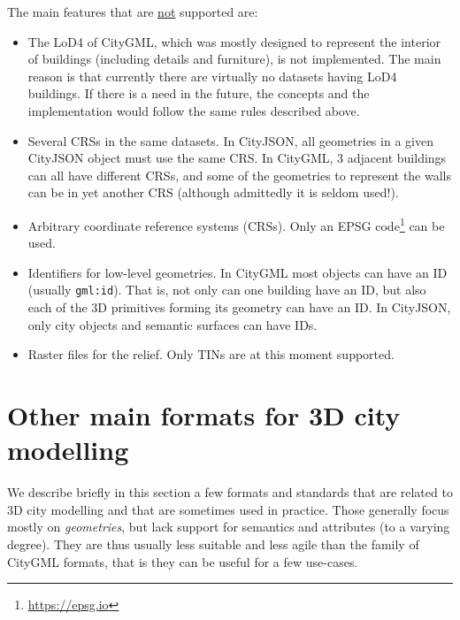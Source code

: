 %

The main features that are \underline{not} supported are:
\begin{itemize}
  \item The LoD4 of CityGML, which was mostly designed to represent the interior of buildings (including details and furniture), is not implemented. The main reason is that currently there are virtually no datasets having LoD4 buildings. If there is a need in the future, the concepts and the implementation would follow the same rules described above.
  \item Several CRSs in the same datasets. In CityJSON, all geometries in a given CityJSON object must use the same CRS\@. In CityGML, 3 adjacent buildings can all have different CRSs, and some of the geometries to represent the walls can be in yet another CRS (although admittedly it is seldom used!).
  \item Arbitrary coordinate reference systems (CRSs). Only an EPSG code\footnote{\url{https://epsg.io}} can be used. 
  \item Identifiers for low-level geometries. In CityGML most objects can have an ID (usually \texttt{gml:id}). That is, not only can one building have an ID, but also each of the 3D primitives forming its geometry can have an ID\@. In CityJSON, only city objects and semantic surfaces can have IDs.
  \item Raster files for the relief. Only TINs are at this moment supported.
\end{itemize}



%
\section{Other main formats for 3D city modelling}

We describe briefly in this section a few formats and standards that are related to 3D city modelling and that are sometimes used in practice.
Those generally focus mostly on \emph{geometries}, but lack support for semantics and attributes (to a varying degree).
They are thus usually less suitable and less agile than the family of CityGML formats, that is they can be useful for a few use-cases.



